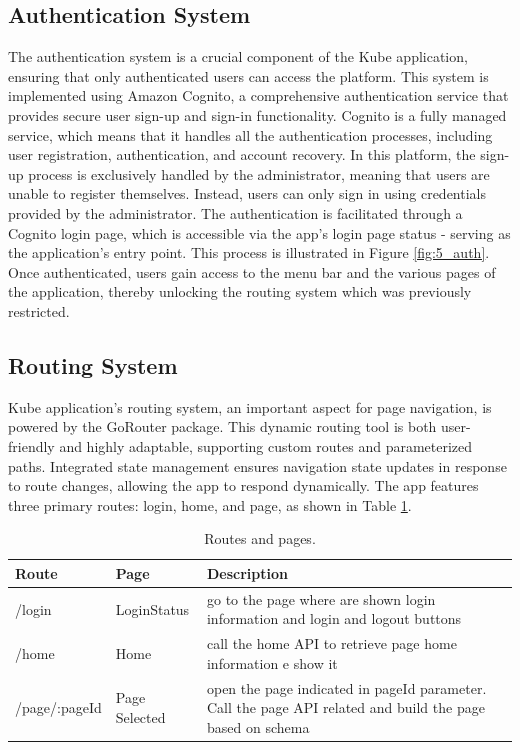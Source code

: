 \subsection{Authentication System}
The authentication system is a crucial component of the Kube application, ensuring that only
authenticated users can access the platform. This system is implemented using Amazon Cognito, a
comprehensive authentication service that provides secure user sign-up and sign-in functionality.
Cognito is a fully managed service, which means that it handles all the authentication processes,
including user registration, authentication, and account recovery.
\newline\newline
In this platform, the sign-up process is exclusively handled by the administrator, meaning that
users are unable to register themselves. Instead, users can only sign in using credentials provided
by the administrator. The authentication is facilitated through a Cognito login page, which is
accessible via the app's login page status - serving as the application's entry point. This process
is illustrated in Figure \ref{fig:5_auth}. Once authenticated, users gain access to the menu bar and
the various pages of the application, thereby unlocking the routing system which was previously
restricted.


\subsection{Routing System}
Kube application's routing system, an important aspect for page navigation, is powered by the
GoRouter package. This dynamic routing tool is both user-friendly and highly adaptable, supporting
custom routes and parameterized paths. Integrated state management ensures navigation state updates
in response to route changes, allowing the app to respond dynamically. The app features three
primary routes: login, home, and page, as shown in Table \ref{tab:5_routes}.

\begin{table}
    \centering
    \begin{tabular}{|l|l|m{7cm}|}
        \hline
        \textbf{Route} & \textbf{Page} & \textbf{Description}                                                                                      \\ \hline
        /login         & LoginStatus   & go to the page where are shown login information and login and logout buttons                             \\ \hline
        /home          & Home          & call the home API to retrieve page home information e show it                                             \\ \hline
        /page/:pageId  & Page Selected & open the page indicated in pageId parameter. Call the page API related and build the page based on schema \\ \hline
    \end{tabular}
    \caption{Routes and pages.}
    \label{tab:5_routes}
\end{table}

